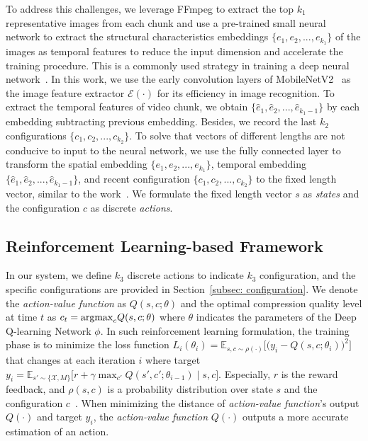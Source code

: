 To address this challenges, we leverage FFmpeg \cite{FFmpeg} to extract the top $k_1$ representative images from each chunk and use a pre-trained small neural network to extract the structural characteristics embeddings $ \{e_1,e_2,...,e_{k_1}\} $ of the images as temporal features to reduce the input dimension and accelerate the training procedure. This is a commonly used strategy in training a deep neural network~\cite{finetunning,finetunning2}. In this work, we use the early convolution layers of MobileNetV2~\cite{MobileNetV2} as the image feature extractor $ \mathcal{E}(\cdot) $ for its efficiency in image recognition. To extract the temporal features of video chunk, we obtain $ \{\hat{e}_1,\hat{e}_2,...,\hat{e}_{{k_1}-1}\} $ by each embedding subtracting previous embedding. Besides, we record the last $k_2$ configurations $ \{c_1,c_2,...,c_{k_2}\} $. To solve that vectors of different lengths are not conducive to input to the neural network, we use the fully connected layer to transform the spatial embedding $ \{e_1,e_2,...,e_{k_1}\} $, temporal embedding $ \{\hat{e}_1,\hat{e}_2,...,\hat{e}_{{k_1}-1}\} $, and recent configuration $ \{c_1,c_2,...,c_{k_2}\} $ to the fixed length vector, similar to the work~\cite{pensieve}. We formulate the fixed length vector $ s $ as \emph{states} and the configuration $ c $ as discrete \emph{actions}.

\subsection{Reinforcement Learning-based Framework}

In our system, we define $k_3$ discrete actions to indicate $k_3$ configuration, and the specific configurations are provided in Section~\ref{subsec: configuration}. We denote the \emph{action-value function} as $ Q(s, c; \theta) $ and the optimal compression quality level at time $ t $ as $  c_t = {\rm argmax}_cQ(s, c; \theta) $ where $ \theta $ indicates the parameters of the Deep Q-learning Network $ \phi $. In such reinforcement learning formulation, the training phase is to minimize the loss function $ L_i(\theta_i) = \mathbb{E}_{s, c \sim \rho (\cdot)}\Big[\big(y_i - Q(s, c; \theta_i)\big)^2 \Big] $ that changes at each iteration $ i $ where target $ y_i = \mathbb{E}_{s' \sim \{\mathcal{X}, M\}} \big[ r + \gamma \max_{c'} Q(s', c'; \theta_{i-1}) \mid s, c \big] $. Especially, $ r $ is the reward feedback, and $ \rho(s, c) $ is a probability distribution over state  $ s $ and the configuration $ c $~\cite{DQN}. When minimizing the distance of \emph{action-value function}'s output $ Q(\cdot) $ and target $ y_i $, the \emph{action-value function} $ Q(\cdot) $ outputs a more accurate estimation of an action. 

